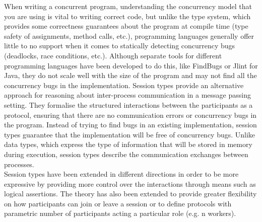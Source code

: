 \documentclass[12pt,twoside]{report}
\newcommand{\comment}[1]{}
\begin{document}
When writing a concurrent program, understanding the concurrency model that you are using is vital to writing correct code, but unlike the type system, which provides some correctness guarantees about the program at compile time (type safety of assignments, method calls, etc.), programming languages generally offer little to no support when it comes to statically detecting concurrency bugs (deadlocks, race conditions, etc.). Although separate tools for different programming languages have been developed to do this, like FindBugs\cite{FindBugs} or Jlint\cite{JLint} for Java\comment{How Good is Static Analysis at Finding Concurrency Bugs?/Find Bugs paper and chord paper}, they do not scale well with the size of the program and may not find all the concurrency bugs in the implementation\cite{ConcurrencyTools}. Session types\cite{binarysessiontypes1} provide an alternative approach for reasoning about inter-process communication in a message passing setting. They formalise the structured interactions between the participants as a protocol, ensuring that there are no communication errors or concurrency bugs in the program. Instead of trying to find bugs in an existing implementation, session types guarantee that the implementation will be free of concurrency bugs. Unlike data types, which express the type of information that will be stored in memory during execution, session types describe the communication exchanges between processes.\\

Session types have been extended in different directions in order to be more expressive by providing more control over the interactions through means such as logical assertions\cite{logicaassertions}. The theory has also been extended to provide greater flexibility on how participants can join or leave a session\cite{multirolesessiontypes} or to define protocols with parametric number of participants acting a particular role (e.g. n workers)\cite{parametrictypes}.\\
\end{document}
